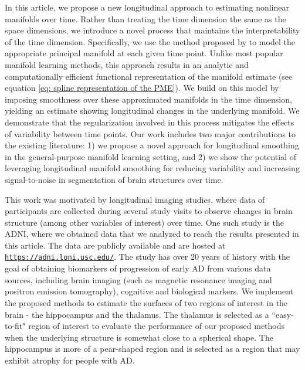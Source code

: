 \documentclass[12pt]{article}
\theoremstyle{definition}
\begin{document}
In this article, we propose a new longitudinal approach to estimating nonlinear manifolds over time. Rather than treating the time dimension the same as the space dimensions, we introduce a novel process that maintains the interpretability of the time dimension. Specifically, we use the method proposed by \cite{meng2021Principal} to model the appropriate principal manifold at each given time point. Unlike most popular manifold learning methods, this approach results in an analytic and computationally efficient functional representation of the manifold estimate (see equation \eqref{eq: spline representation of the PME}). We build on this model by imposing smoothness over these approximated manifolds in the time dimension, yielding an estimate showing longitudinal changes in the underlying manifold. We demonstrate that the regularization involved in this process mitigates the effects of variability between time points. Our work includes two major contributions to the existing literature: 1) we propose a novel approach for longitudinal smoothing in the general-purpose manifold learning setting, and 2) we show the potential of leveraging longitudinal manifold smoothing for reducing variability and increasing signal-to-noise in segmentation of brain structures over time.

This work was motivated by longitudinal imaging studies, where data of participants are collected during several study visits to observe changes in brain structure (among other variables of interest) over time. One such study is the ADNI, where we obtained data that we analyzed to reach the results presented in this article. The data are publicly available and are hosted at \href{https://adni.loni.usc.edu/}{\texttt{https://adni.loni.usc.edu/}}. The study has over 20 years of history with the goal of obtaining biomarkers of progression of early AD from various data sources, including brain imaging (such as magnetic resonance imaging and positron emission tomography), cognitive and biological markers. We implement the proposed methods to estimate the surfaces of two regions of interest in the brain - the hippocampus and the thalamus. The thalamus is selected as a ``easy-to-fit" region of interest to evaluate the performance of our proposed methods when the underlying structure is somewhat close to a spherical shape. The hippocampus is more of a pear-shaped region and is selected as a region that may exhibit atrophy for people with AD.
\end{document}
